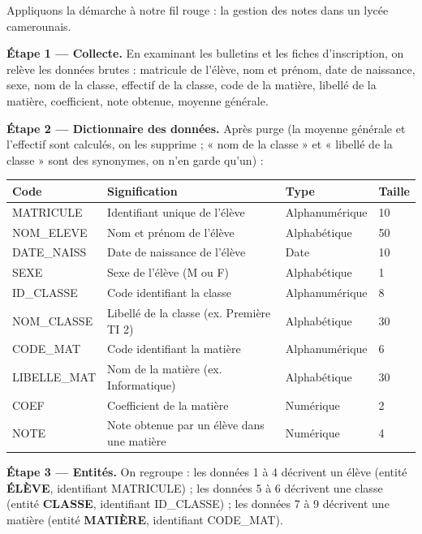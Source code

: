 \documentclass[11pt]{article}
\begin{document}
Appliquons la démarche à notre fil rouge : la gestion des notes dans un lycée camerounais.

\textbf{Étape 1 — Collecte.} En examinant les bulletins et les fiches d'inscription, on relève les données brutes : matricule de l'élève, nom et prénom, date de naissance, sexe, nom de la classe, effectif de la classe, code de la matière, libellé de la matière, coefficient, note obtenue, moyenne générale.

\textbf{Étape 2 — Dictionnaire des données.} Après purge (la moyenne générale et l'effectif sont calculés, on les supprime ; « nom de la classe » et « libellé de la classe » sont des synonymes, on n'en garde qu'un) :

\begin{center}
\begin{tabularx}{\linewidth}{|l|X|l|l|}
\hline
\rowcolor{popblueL} \textbf{Code} & \textbf{Signification} & \textbf{Type} & \textbf{Taille} \\
\hline
MATRICULE & Identifiant unique de l'élève & Alphanumérique & 10 \\
\hline
NOM\_ELEVE & Nom et prénom de l'élève & Alphabétique & 50 \\
\hline
DATE\_NAISS & Date de naissance de l'élève & Date & 10 \\
\hline
SEXE & Sexe de l'élève (M ou F) & Alphabétique & 1 \\
\hline
ID\_CLASSE & Code identifiant la classe & Alphanumérique & 8 \\
\hline
NOM\_CLASSE & Libellé de la classe (ex. Première TI 2) & Alphabétique & 30 \\
\hline
CODE\_MAT & Code identifiant la matière & Alphanumérique & 6 \\
\hline
LIBELLE\_MAT & Nom de la matière (ex. Informatique) & Alphabétique & 30 \\
\hline
COEF & Coefficient de la matière & Numérique & 2 \\
\hline
NOTE & Note obtenue par un élève dans une matière & Numérique & 4 \\
\hline
\end{tabularx}
\end{center}

\textbf{Étape 3 — Entités.} On regroupe : les données 1 à 4 décrivent un élève (entité \textbf{ÉLÈVE}, identifiant MATRICULE) ; les données 5 à 6 décrivent une classe (entité \textbf{CLASSE}, identifiant ID\_CLASSE) ; les données 7 à 9 décrivent une matière (entité \textbf{MATIÈRE}, identifiant CODE\_MAT).
\end{document}
